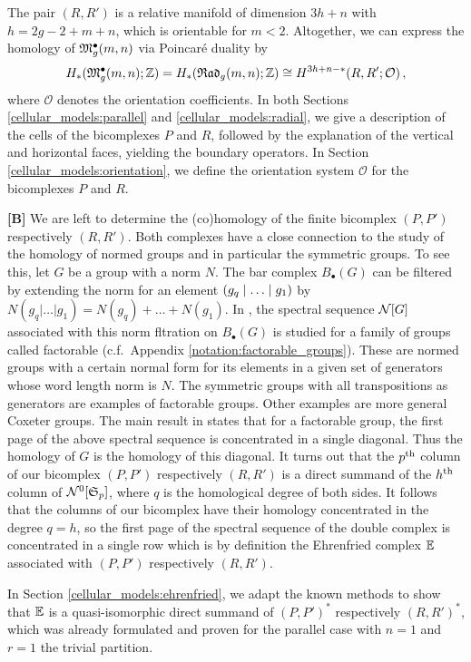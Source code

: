 The pair $(R, R')$ is a relative manifold of dimension $3h + n$ with $h = 2g - 2 + m + n$, which is orientable for $m < 2$.
Altogether, we can express the homology of $\mathfrak{M}^\bullet_g(m, n)$ via Poincaré duality by
\[
    H_\ast( \mathfrak{M}^\bullet_g(m, n); \mathbb Z ) = H_\ast( {\mathfrak{Rad}_g(m,n)}; \mathbb Z ) \cong H^{3h+n-\ast}( R, R'; \mathcal O)\,,
\]
where $\mathcal O$ denotes the orientation coefficients.
In both Sections \ref{cellular_models:parallel} and \ref{cellular_models:radial}, we give a description of the cells of the bicomplexes $P$ and $R$,
followed by the explanation of the vertical and horizontal faces, yielding the boundary operators.
In Section \ref{cellular_models:orientation}, we define the orientation system $\mathcal O$ for the bicomplexes $P$ and $R$.

{\bf [B]} We are left to determine the (co)homology of the finite bicomplex $(P,P')$ respectively $(R,R')$.
Both complexes have a close connection to the study of the homology of normed groups and in particular the symmetric groups.
To see this, let $G$ be a group with a norm $N$.
The bar complex $B_\bullet(G)$ can be filtered by extending the norm for an element $\inhomq[g]$ by
$N(g_q | \ldots | g_1) = N(g_q) + \ldots + N(g_1)$.
In \cite{Visy201011}, the spectral sequence $\mathcal{N}[G]$ associated with this norm fltration on $B_\bullet(G)$ is studied for a family of groups called factorable (c.f.\ Appendix \ref{notation:factorable_groups}).
These are normed groups with a certain normal form for its elements in a given set of generators whose word length norm is $N$.
The symmetric groups with all transpositions as generators are examples of factorable groups.
Other examples are more general Coxeter groups.
The main result in \cite{Visy201011} states that for a factorable group, the first page of the above spectral sequence is concentrated in a single diagonal.
Thus the homology of $G$ is the homology of this diagonal.
It turns out that the $p^{\text{th}}$ column of our bicomplex $(P,P')$ respectively $(R,R')$ is a direct summand of the $h^{\text{th}}$ column of $\mathcal{N}^0[\mathfrak S_p]$,
where $q$ is the homological degree of both sides.
It follows that the columns of our bicomplex have their homology concentrated in the degree $q=h$,
so the first page of the spectral sequence of the double complex is concentrated in a single row which is by definition the Ehrenfried complex $\mathbb E$ associated with $(P,P')$ respectively $(R,R')$.

In Section \ref{cellular_models:ehrenfried}, we adapt the known methods to show that $\mathbb E$ is a quasi-isomorphic direct summand of $(P,P')^\ast$ respectively $(R,R')^\ast$,
which was already formulated and proven for the parallel case with $n=1$ and $r=1$ the trivial partition.

